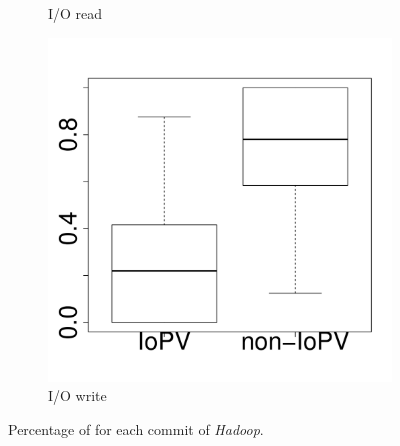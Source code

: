 \begin{figure}[t]
\begin{subfigure}{0.19\textwidth}
                \caption{I/O read}
        \end{subfigure}
        \begin{subfigure}{0.19\textwidth}
                \includegraphics[width=\linewidth]{Figures/iowrite-hadoop-boxplot.pdf}
                \caption{I/O write}
        \end{subfigure}
        
	\caption{Percentage of \inconsistent for each commit of \emph{Hadoop}.}
	\label{fig:iopv_per_commit_hadoop}
\end{figure}

